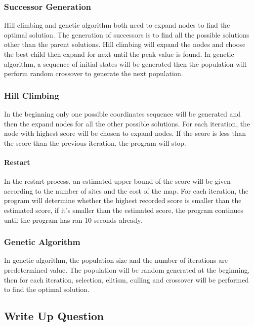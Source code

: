 \documentclass[11pt, a4paper]{article}
\begin{document}
\subsubsection{Successor Generation}

Hill climbing and genetic algorithm both need to expand nodes to find the optimal solution. The generation of successors is to find all the possible solutions other than the parent solutions. Hill climbing will expand the nodes and choose the best child then expand for next until the peak value is found. In genetic algorithm, a sequence of initial states will be generated then the population will perform random crossover to generate the next population. 


\subsubsection{Hill Climbing}

In the beginning only one possible coordinates sequence will be generated and then the expand nodes for all the other possible solutions. For each iteration, the node with highest score will be chosen to expand nodes. If the score is less than the score than the previous iteration, the program will stop.

\paragraph{Restart}

In the restart process, an estimated upper bound of the score will be given according to the number of sites and the cost of the map. For each iteration, the program will determine whether the highest recorded score is smaller than the estimated score, if it’s smaller than the estimated score, the program continues until the program has ran 10 seconds already. 

\subsubsection{Genetic Algorithm}

In genetic algorithm, the population size and the number of iterations are predetermined value. The population will be random generated at the beginning, then for each iteration, selection, elitism, culling and crossover will be performed to find the optimal solution. 


\subsection{Write Up Question}
\end{document}
